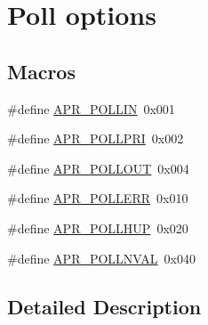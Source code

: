 \hypertarget{group__pollopts}{\section{Poll options}
\label{group__pollopts}
}
\subsection*{Macros}
\begin{DoxyCompactItemize}
\item 
\#define \hyperlink{group__pollopts_ga746222e6b858bc2fc77328d59f78e788}{A\-P\-R\-\_\-\-P\-O\-L\-L\-I\-N}~0x001
\item 
\#define \hyperlink{group__pollopts_ga196c38e1914077c4c9a0cf3ce87f1b9c}{A\-P\-R\-\_\-\-P\-O\-L\-L\-P\-R\-I}~0x002
\item 
\#define \hyperlink{group__pollopts_ga6fb703db1d11e2c5f66d8c6146e56053}{A\-P\-R\-\_\-\-P\-O\-L\-L\-O\-U\-T}~0x004
\item 
\#define \hyperlink{group__pollopts_ga6f5a72fd9cf3f5dcf174acce0b4b77ee}{A\-P\-R\-\_\-\-P\-O\-L\-L\-E\-R\-R}~0x010
\item 
\#define \hyperlink{group__pollopts_gace76603c4fa4b56f8b5977ff1ceb6f3b}{A\-P\-R\-\_\-\-P\-O\-L\-L\-H\-U\-P}~0x020
\item 
\#define \hyperlink{group__pollopts_ga132da215e207d4685fb467cc64a73f1b}{A\-P\-R\-\_\-\-P\-O\-L\-L\-N\-V\-A\-L}~0x040
\end{DoxyCompactItemize}


\subsection{Detailed Description}


